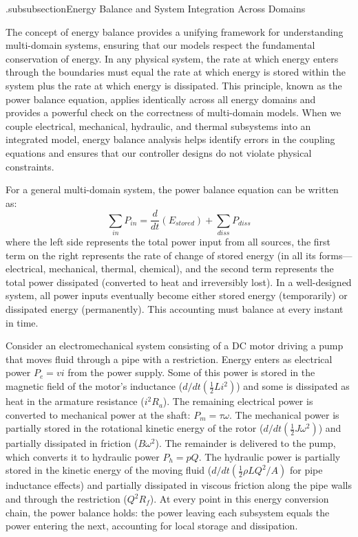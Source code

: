 .subsubsection{Energy Balance and System Integration Across Domains}

The concept of energy balance provides a unifying framework for understanding multi-domain systems, ensuring that our models respect the fundamental conservation of energy. In any physical system, the rate at which energy enters through the boundaries must equal the rate at which energy is stored within the system plus the rate at which energy is dissipated. This principle, known as the power balance equation, applies identically across all energy domains and provides a powerful check on the correctness of multi-domain models. When we couple electrical, mechanical, hydraulic, and thermal subsystems into an integrated model, energy balance analysis helps identify errors in the coupling equations and ensures that our controller designs do not violate physical constraints.

For a general multi-domain system, the power balance equation can be written as:
\begin{equation}
\sum_{in} P_{in} = \frac{d}{dt}(E_{stored}) + \sum_{diss} P_{diss}
\end{equation}
where the left side represents the total power input from all sources, the first term on the right represents the rate of change of stored energy (in all its forms—electrical, mechanical, thermal, chemical), and the second term represents the total power dissipated (converted to heat and irreversibly lost). In a well-designed system, all power inputs eventually become either stored energy (temporarily) or dissipated energy (permanently). This accounting must balance at every instant in time.

Consider an electromechanical system consisting of a DC motor driving a pump that moves fluid through a pipe with a restriction. Energy enters as electrical power $P_e = v i$ from the power supply. Some of this power is stored in the magnetic field of the motor's inductance ($d/dt(\frac{1}{2}Li^2)$) and some is dissipated as heat in the armature resistance ($i^2R_a$). The remaining electrical power is converted to mechanical power at the shaft: $P_m = \tau \omega$. The mechanical power is partially stored in the rotational kinetic energy of the rotor ($d/dt(\frac{1}{2}J\omega^2)$) and partially dissipated in friction ($B\omega^2$). The remainder is delivered to the pump, which converts it to hydraulic power $P_h = pQ$. The hydraulic power is partially stored in the kinetic energy of the moving fluid ($d/dt(\frac{1}{2}\rho L Q^2/A)$ for pipe inductance effects) and partially dissipated in viscous friction along the pipe walls and through the restriction ($Q^2 R_f$). At every point in this energy conversion chain, the power balance holds: the power leaving each subsystem equals the power entering the next, accounting for local storage and dissipation.

